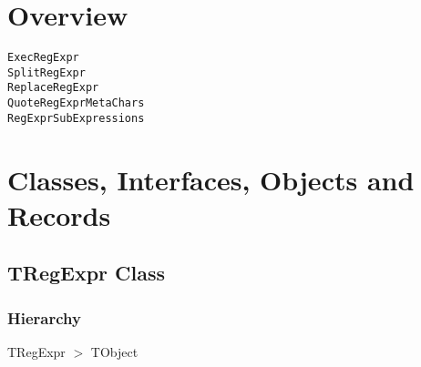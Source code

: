 \documentclass{report}
\newif\ifpdf
\begin{document}
\section{Overview}
\begin{description}
\item[\texttt{\begin{ttfamily}TRegExpr\end{ttfamily} Class}]
\item[\texttt{\begin{ttfamily}ERegExpr\end{ttfamily} Class}]
\end{description}
\begin{description}
\item[\texttt{ExecRegExpr}]
\item[\texttt{SplitRegExpr}]
\item[\texttt{ReplaceRegExpr}]
\item[\texttt{QuoteRegExprMetaChars}]
\item[\texttt{RegExprSubExpressions}]
\end{description}
\section{Classes, Interfaces, Objects and Records}
\ifpdf
\subsection*{\large{\textbf{TRegExpr Class}}\normalsize\hspace{1ex}\hrulefill}
\else
\subsection*{TRegExpr Class}
\fi
\label{RegExpr.TRegExpr}
\subsubsection*{\large{\textbf{Hierarchy}}\normalsize\hspace{1ex}\hfill}
TRegExpr {$>$} TObject
\end{document}

